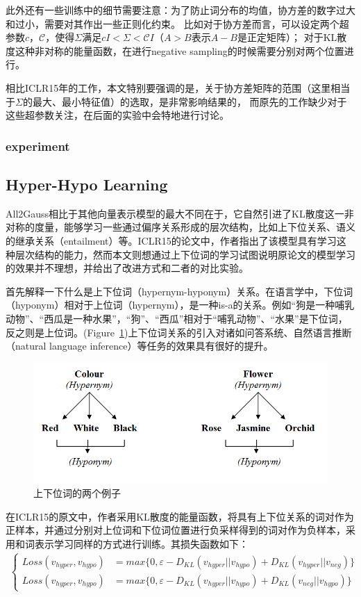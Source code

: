 \documentclass[13pt]{article}
\begin{document}
此外还有一些训练中的细节需要注意：为了防止词分布的均值，协方差的数字过大和过小，需要对其作出一些正则化约束。
比如对于协方差而言，可以设定两个超参数$c$，$\mathcal{C}$，使得$\Sigma$满足$cI<\Sigma<\mathcal{C} I$（$A>B$表示$A-B$是正定矩阵）；
对于KL散度这种非对称的能量函数，在进行negative sampling的时候需要分别对两个位置进行。

相比ICLR15年的工作，本文特别要强调的是，关于协方差矩阵的范围（这里相当于$\Sigma$的最大、最小特征值）的选取，是非常影响结果的，
而原先的工作缺少对于这些超参数关注，在后面的实验中会特地进行讨论。
\subsubsection{experiment}
\subsection{Hyper-Hypo Learning}
All2Gauss相比于其他向量表示模型的最大不同在于，它自然引进了KL散度这一非对称的度量，能够学习一些通过偏序关系形成的层次结构，比如上下位关系、语义的继承关系（entailment）等。ICLR15的论文中，作者指出了该模型具有学习这种层次结构的能力，然而本文则想通过上下位词的学习试图说明原论文的模型学习的效果并不理想，并给出了改进方式和二者的对比实验。

首先解释一下什么是上下位词（hypernym-hyponym）关系。在语言学中，下位词（hyponym）相对于上位词（hypernym），是一种is-a的关系。例如“狗是一种哺乳动物”、“西瓜是一种水果”，“狗”、“西瓜”相对于“哺乳动物”、“水果”是下位词，反之则是上位词。(Figure\ \ref{fig:hyper})上下位词关系的引入对诸如问答系统、自然语言推断（natural language inference）等任务的效果具有很好的提升。

\begin{figure}[h]
	\includegraphics[width=\textwidth]{hypernym-hyponym.png}
	\caption{上下位词的两个例子}
	\centering
	\label{fig:hyper}
\end{figure}

在ICLR15的原文中，作者采用KL散度的能量函数，将具有上下位关系的词对作为正样本，并通过分别对上位词和下位词位置进行负采样得到的词对作为负样本，采用和词表示学习同样的方式进行训练。其损失函数如下：
\begin{align*}
\begin{cases}
Loss(v_{hyper}, v_{hypo}) &= max\{ 0, \varepsilon - D_{KL}(v_{hyper}||v_{hypo}) + D_{KL}(v_{hyper}||v_{neg}) \}  \\
Loss(v_{hyper}, v_{hypo}) &= max\{ 0, \varepsilon - D_{KL}(v_{hyper}||v_{hypo}) + D_{KL}(v_{neg}||v_{hypo}) \}
\end{cases}
\end{align*}
\end{document}
